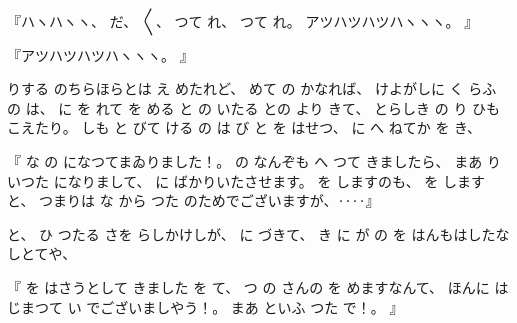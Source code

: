 %
『ハヽハヽヽ、
%
だ、
%
〳〵、
%
つて
れ、
%
つて
れ。
%
アツハツハツハヽヽヽ。
』

%
『アツハツハツハヽヽヽ。
』

%
りする
のちらほらとは
え
めたれど、
%
めて
の
かなれば、
%
けよがしに
く
らふ
の
は、
%
に
を
れて
を
める
と
の
いたる
との
より
きて、
%
とらしき
の
り
ひも
こえたり。
%
しも
と
びて
ける
の
は
び
と
を
はせつ、
%
に
へ
ねてか
を
き、

%
『
な
の
になつてまゐりました！。
%
の
なんぞも
へ
つて
きましたら、
%
まあ
り
いつた
になりまして、
%
に
ばかりいたさせます。
%
を
しますのも、
%
を
しますと、
%
つまりは
な
から
つた
のためでございますが、‥‥』

%
と、
%
ひ
つたる
さを
らしかけしが、
%
に
づきて、
%
き
に
が
の
を
はんもはしたなしとてや、

%
『
を
はさうとして
きました
を
て、
%
つ
の
さんの
を
めますなんて、
%
ほんに
はじまつて
い
でございましやう！。
%
まあ
といふ
つた
で！。
』

